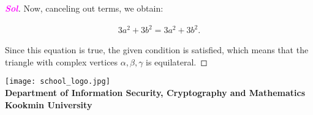 \documentclass{article}
\newcommand{\footer}[1]{
\begin{flushright}
	\vspace{2em}
	\texttt{[image: school\_logo.jpg]} \\
	\vspace{1em}
	\textcolor{blue2}{\small\textbf{#1}}
\end{flushright}
}
\theoremstyle{definition}
\newcommand{\sol}{\textcolor{magenta}{\bf Sol}}
\begin{document}
\begin{enumerate}
\begin{proof}[\sol]
	Now, canceling out terms, we obtain:

	\begin{align*}
		3a^2 + 3b^2 = 3a^2 + 3b^2.
	\end{align*}

	Since this equation is true, the given condition is satisfied, which means that the triangle with complex vertices $\alpha, \beta, \gamma$ is equilateral. 
	\end{proof}
\end{enumerate}


\footer{Department of Information Security, Cryptography and Mathematics\\ Kookmin University}
\end{document}
